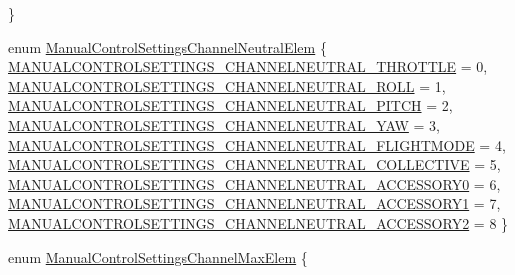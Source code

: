 \begin{DoxyCompactItemize}
 \}
\item 
enum \hyperlink{group___manual_control_settings_ga8d0c149b3158389f7ddca170c9111532}{\-Manual\-Control\-Settings\-Channel\-Neutral\-Elem} \{ \*
\hyperlink{group___manual_control_settings_gga8d0c149b3158389f7ddca170c9111532a0286dd484b34ee977cfef367fab1b29c}{\-M\-A\-N\-U\-A\-L\-C\-O\-N\-T\-R\-O\-L\-S\-E\-T\-T\-I\-N\-G\-S\-\_\-\-C\-H\-A\-N\-N\-E\-L\-N\-E\-U\-T\-R\-A\-L\-\_\-\-T\-H\-R\-O\-T\-T\-L\-E} = 0, 
\hyperlink{group___manual_control_settings_gga8d0c149b3158389f7ddca170c9111532ab9ee1375f1110d1140c4cddb5f84a52f}{\-M\-A\-N\-U\-A\-L\-C\-O\-N\-T\-R\-O\-L\-S\-E\-T\-T\-I\-N\-G\-S\-\_\-\-C\-H\-A\-N\-N\-E\-L\-N\-E\-U\-T\-R\-A\-L\-\_\-\-R\-O\-L\-L} = 1, 
\hyperlink{group___manual_control_settings_gga8d0c149b3158389f7ddca170c9111532a86ddcd9cdf3699548b7fdbabd50c3337}{\-M\-A\-N\-U\-A\-L\-C\-O\-N\-T\-R\-O\-L\-S\-E\-T\-T\-I\-N\-G\-S\-\_\-\-C\-H\-A\-N\-N\-E\-L\-N\-E\-U\-T\-R\-A\-L\-\_\-\-P\-I\-T\-C\-H} = 2, 
\hyperlink{group___manual_control_settings_gga8d0c149b3158389f7ddca170c9111532ae5cd4bea76cd01030d63b1d7d5a99242}{\-M\-A\-N\-U\-A\-L\-C\-O\-N\-T\-R\-O\-L\-S\-E\-T\-T\-I\-N\-G\-S\-\_\-\-C\-H\-A\-N\-N\-E\-L\-N\-E\-U\-T\-R\-A\-L\-\_\-\-Y\-A\-W} = 3, 
\*
\hyperlink{group___manual_control_settings_gga8d0c149b3158389f7ddca170c9111532aa9cb610bd26bb4bd3fa2363288475694}{\-M\-A\-N\-U\-A\-L\-C\-O\-N\-T\-R\-O\-L\-S\-E\-T\-T\-I\-N\-G\-S\-\_\-\-C\-H\-A\-N\-N\-E\-L\-N\-E\-U\-T\-R\-A\-L\-\_\-\-F\-L\-I\-G\-H\-T\-M\-O\-D\-E} = 4, 
\hyperlink{group___manual_control_settings_gga8d0c149b3158389f7ddca170c9111532a9f30f1147bbe0f62e33d7ad893e374f4}{\-M\-A\-N\-U\-A\-L\-C\-O\-N\-T\-R\-O\-L\-S\-E\-T\-T\-I\-N\-G\-S\-\_\-\-C\-H\-A\-N\-N\-E\-L\-N\-E\-U\-T\-R\-A\-L\-\_\-\-C\-O\-L\-L\-E\-C\-T\-I\-V\-E} = 5, 
\hyperlink{group___manual_control_settings_gga8d0c149b3158389f7ddca170c9111532a5bbdf05adbb0fb14ce836838ffdd6076}{\-M\-A\-N\-U\-A\-L\-C\-O\-N\-T\-R\-O\-L\-S\-E\-T\-T\-I\-N\-G\-S\-\_\-\-C\-H\-A\-N\-N\-E\-L\-N\-E\-U\-T\-R\-A\-L\-\_\-\-A\-C\-C\-E\-S\-S\-O\-R\-Y0} = 6, 
\hyperlink{group___manual_control_settings_gga8d0c149b3158389f7ddca170c9111532a6086450f89f38a8046e1e13e91e76ecf}{\-M\-A\-N\-U\-A\-L\-C\-O\-N\-T\-R\-O\-L\-S\-E\-T\-T\-I\-N\-G\-S\-\_\-\-C\-H\-A\-N\-N\-E\-L\-N\-E\-U\-T\-R\-A\-L\-\_\-\-A\-C\-C\-E\-S\-S\-O\-R\-Y1} = 7, 
\*
\hyperlink{group___manual_control_settings_gga8d0c149b3158389f7ddca170c9111532ad63926c4bc8fa79c8ca3681b2648507f}{\-M\-A\-N\-U\-A\-L\-C\-O\-N\-T\-R\-O\-L\-S\-E\-T\-T\-I\-N\-G\-S\-\_\-\-C\-H\-A\-N\-N\-E\-L\-N\-E\-U\-T\-R\-A\-L\-\_\-\-A\-C\-C\-E\-S\-S\-O\-R\-Y2} = 8
 \}
\item 
enum \hyperlink{group___manual_control_settings_ga75e7c93fcc930ec290a19ff04f699af3}{\-Manual\-Control\-Settings\-Channel\-Max\-Elem} \{ \*

\end{DoxyCompactItemize}
